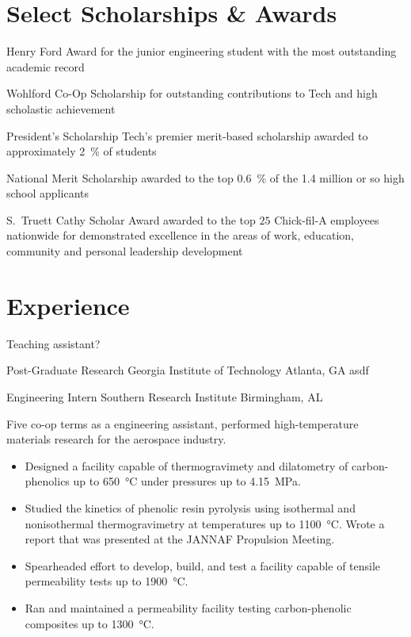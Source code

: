 \documentclass[10pt,letterpaper,roman]{moderncv}   %
\newcommand\cvdesc[2]{%
  \cventry{}%
  {#1}%
  {}%
  {\small #2}%
  {}%
  {}%
}
\begin{document}
\section{Select Scholarships \& Awards}
  \cvdesc{Henry Ford Award}{for the junior engineering student with
    the most outstanding academic record}
  \cvdesc{Wohlford Co-Op Scholarship}{for outstanding contributions to
    Tech and high scholastic achievement}
  \cvdesc{President's Scholarship}{Tech's premier merit-based
    scholarship awarded to approximately \SI{2}{\percent} of students}
  \cvdesc{National Merit Scholarship}{awarded to the top
    \SI{0.6}{\percent} of the \num{1.4} million or so high school
    applicants}
  \cvdesc{S.\ Truett Cathy Scholar Award}{awarded to the top $25$
    Chick-fil-A employees nationwide for demonstrated excellence in
    the areas of work, education, community and personal leadership
    development}

\section{Experience}

  {Teaching assistant?}
  {}
  {}
  {}
  {}

  {Post-Graduate Research}
  {Georgia Institute of Technology}
  {Atlanta, GA}
  {}
  {%
    asdf
  }

\let\labelitemi\labelitemii
{}
  {Engineering Intern}
  {Southern Research Institute}
  {Birmingham, AL}
  {}
  {%
    Five co-op terms as a engineering assistant, performed
    high-temperature materials research for the aerospace industry.
    \begin{itemize}%
      \item Designed a facility capable of thermogravimety and
        dilatometry of carbon-phenolics up to \SI{650}{\celsius} under
        pressures up to \SI{4.15}{\mega\pascal}.
      \item Studied the kinetics of phenolic resin pyrolysis using
        isothermal and nonisothermal thermogravimetry at temperatures
        up to \SI{1100}{\celsius}. Wrote a report that was presented
        at the  JANNAF Propulsion Meeting.
      \item Spearheaded effort to develop, build, and test a facility
        capable of tensile permeability tests up to
        \SI{1900}{\celsius}.
      \item Ran and maintained a permeability facility testing
        carbon-phenolic composites up to \SI{1300}{\celsius}.
    \end{itemize}
  }
\end{document}

